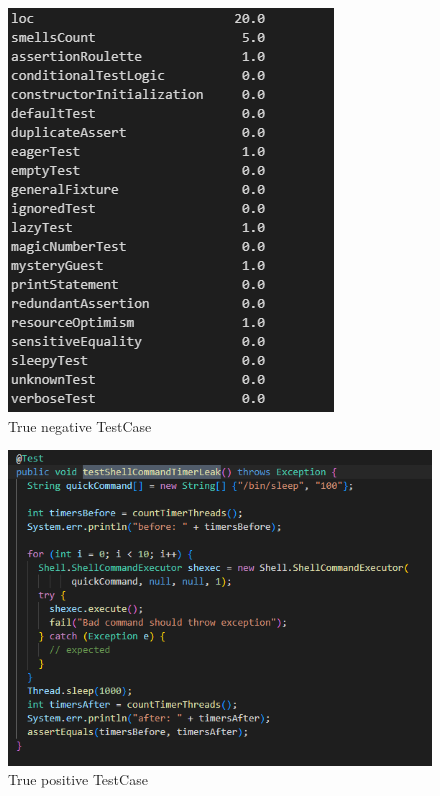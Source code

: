 \documentclass[sigconf,review]{acmart}
\begin{document}
\begin{figure}
    \centering
    \includegraphics[scale=0.3]{ConfusionMatrix/tnpara.png}
    \caption{True negative TestCase}
    \label{fig:my_label}
\end{figure}

\begin{figure}
    \centering
    \includegraphics[scale=0.3]{ConfusionMatrix/tptest.png}
    \caption{True positive TestCase}
    \label{fig:my_label}
\end{figure}
\end{document}
